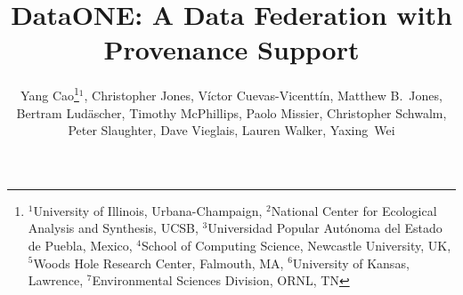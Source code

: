 \documentclass[a4paper]{llncs}
\begin{document}
\mainmatter  %

\title{DataONE: A Data Federation with Provenance Support}


\author{{Yang Cao\thanks{
$^1$University of Illinois, Urbana-Champaign, 
$^2$National Center for Ecological Analysis and Synthesis, UCSB,
$^3$Universidad Popular Aut\'onoma del Estado de Puebla, Mexico,
$^4$School of Computing Science, Newcastle  University, UK,
$^5$Woods Hole Research Center, Falmouth, MA,
$^6$University of Kansas, Lawrence,
$^7$Environmental Sciences Division, ORNL, TN}$^1$,
Christopher Jones,  V\'ictor Cuevas-Vicentt\'in, Matthew B.\ Jones,  Bertram Lud\"ascher,  Timothy McPhillips,  Paolo Missier,   Christopher Schwalm,  Peter Slaughter,  Dave Vieglais,  Lauren Walker, Yaxing~Wei }}

\institute{\relax}





%
%

\maketitle
\end{document}
